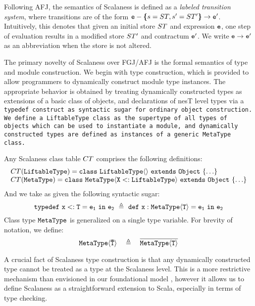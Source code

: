 Following AFJ, the semantics of Scalaness is defined as a \emph{labeled transition system},
where transitions are of the form $\tt{e} - \lc s = \jstore, s' = \jstore' \rc \rightarrow
\tt{e}' $. Intuitively, this denotes that given an initial store $\jstore$ and expression
$\tt{e}$, one step of evaluation results in a modified store $\jstore'$ and contractum
$\tt{e}'$. We write $\tt{e} \rightarrow \tt{e}'$ as an abbreviation when the store is not
altered.

The primary novelty of Scalaness over FGJ/AFJ is the formal semantics of type and module
construction. We begin with type construction, which is provided to allow programmers to
dynamically construct module type instances. The appropriate behavior is obtained by treating
dynamically constructed types as extensions of a basic class of objects, and declarations of
nesT level types via a \tt{typedef} construct as syntactic sugar for ordinary object
construction. We define a \tt{LiftableType} class as the supertype of all types of objects which
can be used to instantiate a module, and dynamically constructed types are defined as instances
of a generic \tt{MetaType} class.
\begin{definition}
  Any Scalaness class table $\CT$ comprises the following definitions:
$$
\begin{array}{l}
\CT(\tt{LiftableType}) = \gclass{\tt{LiftableType}}{}{Object}{\ldots}\\
\CT(\tt{MetaType}) = \gclass{\tt{MetaType}}{\tt{X <: LiftableType}}{Object}{ \ldots }
\end{array}
$$
And we take as given the following syntactic sugar:
$$
\jtlet{x}{T}{e_1}{e_2}\ \defeq\ \jdef{x}{\jinst{MetaType}{T}}{e_1}{e_2}
$$
Class type $\tt{MetaType}$ is generalized on a single type variable. For brevity of 
notation, we define:
$$
\jinst{\tt{MetaType}}{\ttvec{T}}\quad \defeq \quad \overline{\jinst{MetaType}{T}}
$$
\end{definition}
A crucial fact of Scalaness type construction is that any dynamically constructed type cannot be
treated as a type at the Scalaness level. This is a more restrictive mechanism than envisioned
in our foundational model \cite{FramedML,FramedMLworkshop}, however it allows us to define
Scalaness as a straightforward extension to Scala, especially in terms of type checking.

